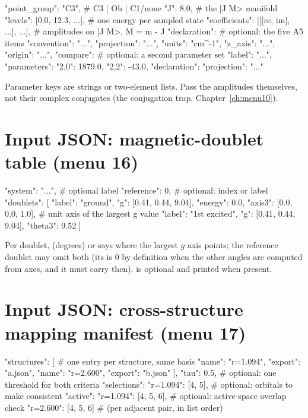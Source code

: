 \begin{codeblock}
{
  "point_group": "C3",                  # C3 | Oh | C1/none
  "J": 8.0,                             # the |J M> manifold
  "levels": [0.0, 12.3, ...],           # one energy per sampled state
  "coefficients": [[[re, im], ...], ...],  # amplitudes on |J M>, M = m - J
  "declaration": {                      # optional: the five A5 items
    "convention": "...", "projection": "...", "units": "cm^-1",
    "z_axis": "...", "origin": "..."},
  "compare": {                          # optional: a second parameter set
    "label": "...",
    "parameters": {"2,0": 1879.0, "2,2": -43.0},
    "declaration": {"projection": "..."}}
}
\end{codeblock}

Parameter keys are  strings or two-element lists. Pass the
amplitudes themselves, not their complex conjugates (the conjugation trap,
Chapter~\ref{ch:menu10}).

\section{Input JSON: magnetic-doublet table (menu 16)}

\begin{codeblock}
{
  "system": "...",                       # optional label
  "reference": 0,                        # optional: index or label
  "doublets": [
    {"label": "ground", "g": [0.41, 0.44, 9.04], "energy": 0.0,
     "axis3": [0.0, 0.0, 1.0]},          # unit axis of the largest g value
    {"label": "1st excited", "g": [0.41, 0.44, 9.04], "theta3": 9.52}
  ]
}
\end{codeblock}

Per doublet,  (degrees) or  says where the largest
$g$ axis points; the reference doublet may omit both (its  is 0
by definition when the other angles are computed from axes, and it must carry
 then).  is optional and printed when present.

\section{Input JSON: cross-structure mapping manifest (menu 17)}

\begin{codeblock}
{
  "structures": [                         # one entry per structure, same basis
    {"name": "r=1.094", "export": "a.json"},
    {"name": "r=2.600", "export": "b.json"}
  ],
  "tau": 0.5,                             # optional: one threshold for both criteria
  "selections": {"r=1.094": [4, 5]},      # optional: orbitals to make consistent
  "active": {"r=1.094": [4, 5, 6],        # optional: active-space overlap check
             "r=2.600": [4, 5, 6]}        # (per adjacent pair, in list order)
}
\end{codeblock}

